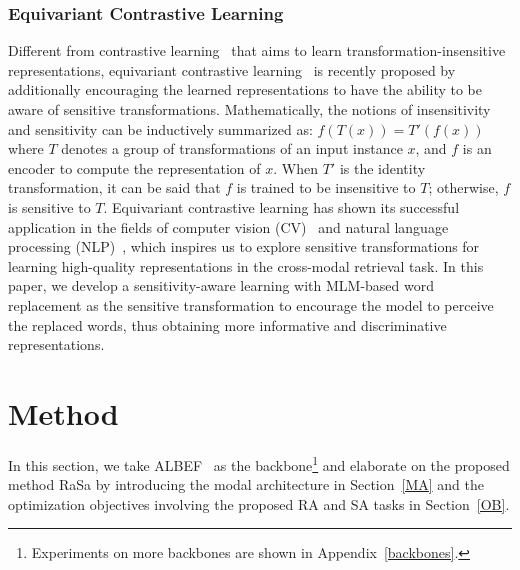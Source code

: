 \documentclass{article}
\begin{document}
\subsubsection{Equivariant Contrastive Learning}
Different from contrastive learning~\cite{he2020momentum} that aims to learn transformation-insensitive representations, equivariant contrastive learning~\cite{dangovski2022equivariant} is recently proposed by additionally encouraging the learned representations to have the ability to be aware of sensitive transformations.
Mathematically, the notions of insensitivity and sensitivity can be inductively summarized as: $f(T(x)) = T'(f(x))$ where $T$ denotes a group of transformations of an input instance $x$, and $f$ is an encoder to compute the representation of $x$.
When $T'$ is the identity transformation, it can be said that $f$ is trained to be insensitive to $T$; otherwise, $f$ is sensitive to $T$.
Equivariant contrastive learning has shown its successful application in the fields of computer vision (CV)~\cite{dangovski2022equivariant} and natural language processing (NLP)~\cite{chuang2022diffcse}, which inspires us to explore sensitive transformations for learning high-quality representations in the cross-modal retrieval task.
In this paper, we develop a sensitivity-aware learning with MLM-based word replacement as the sensitive transformation to encourage the model to perceive the replaced words, thus obtaining more informative and discriminative representations.


\section{Method}
In this section, we take ALBEF~\cite{NEURIPS2021_50525975} as the backbone\footnote{Experiments on more backbones are shown in Appendix~\ref{backbones}.} and elaborate on the proposed method RaSa by introducing the modal architecture in Section~\ref{MA} and the optimization objectives involving the proposed RA and SA tasks in Section~\ref{OB}.
\end{document}
